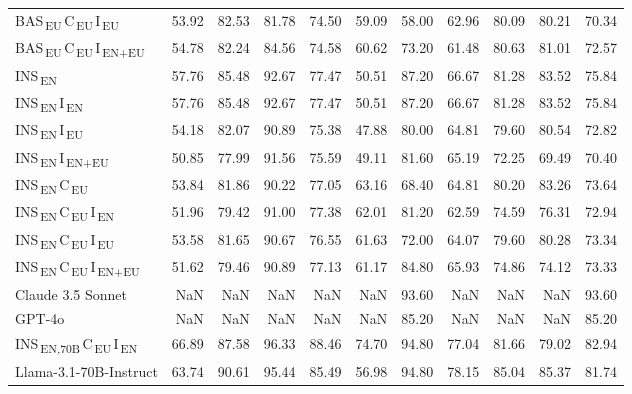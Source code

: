 \begin{tabular}{lrrrrrrrrrr}
BAS\textsubscript{\,EU}\,C\textsubscript{\,EU}\,I\textsubscript{\,EU} & 53.92 & 82.53 & 81.78 & 74.50 & 59.09 & 58.00 & 62.96 & 80.09 & 80.21 & 70.34 \\
BAS\textsubscript{\,EU}\,C\textsubscript{\,EU}\,I\textsubscript{\,EN+EU} & 54.78 & 82.24 & 84.56 & 74.58 & 60.62 & 73.20 & 61.48 & 80.63 & 81.01 & 72.57 \\
INS\textsubscript{\,EN} & 57.76 & 85.48 & 92.67 & 77.47 & 50.51 & 87.20 & 66.67 & 81.28 & 83.52 & 75.84 \\
INS\textsubscript{\,EN}\,I\textsubscript{\,EN} & 57.76 & 85.48 & 92.67 & 77.47 & 50.51 & 87.20 & 66.67 & 81.28 & 83.52 & 75.84 \\
INS\textsubscript{\,EN}\,I\textsubscript{\,EU} & 54.18 & 82.07 & 90.89 & 75.38 & 47.88 & 80.00 & 64.81 & 79.60 & 80.54 & 72.82 \\
INS\textsubscript{\,EN}\,I\textsubscript{\,EN+EU} & 50.85 & 77.99 & 91.56 & 75.59 & 49.11 & 81.60 & 65.19 & 72.25 & 69.49 & 70.40 \\
INS\textsubscript{\,EN}\,C\textsubscript{\,EU} & 53.84 & 81.86 & 90.22 & 77.05 & 63.16 & 68.40 & 64.81 & 80.20 & 83.26 & 73.64 \\
INS\textsubscript{\,EN}\,C\textsubscript{\,EU}\,I\textsubscript{\,EN} & 51.96 & 79.42 & 91.00 & 77.38 & 62.01 & 81.20 & 62.59 & 74.59 & 76.31 & 72.94 \\
INS\textsubscript{\,EN}\,C\textsubscript{\,EU}\,I\textsubscript{\,EU} & 53.58 & 81.65 & 90.67 & 76.55 & 61.63 & 72.00 & 64.07 & 79.60 & 80.28 & 73.34 \\
INS\textsubscript{\,EN}\,C\textsubscript{\,EU}\,I\textsubscript{\,EN+EU} & 51.62 & 79.46 & 90.89 & 77.13 & 61.17 & 84.80 & 65.93 & 74.86 & 74.12 & 73.33 \\
Claude 3.5 Sonnet & NaN & NaN & NaN & NaN & NaN & 93.60 & NaN & NaN & NaN & 93.60 \\
GPT-4o & NaN & NaN & NaN & NaN & NaN & 85.20 & NaN & NaN & NaN & 85.20 \\
INS\textsubscript{\,EN,70B}\,C\textsubscript{\,EU}\,I\textsubscript{\,EN} & 66.89 & 87.58 & 96.33 & 88.46 & 74.70 & 94.80 & 77.04 & 81.66 & 79.02 & 82.94 \\
Llama-3.1-70B-Instruct & 63.74 & 90.61 & 95.44 & 85.49 & 56.98 & 94.80 & 78.15 & 85.04 & 85.37 & 81.74 \\
\bottomrule
\end{tabular}
